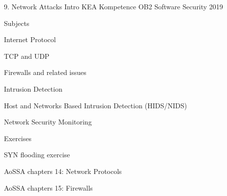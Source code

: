 \documentclass[Screen16to9,17pt]{foils}
\begin{document}
\mytitlepage
{9. Network Attacks Intro}
{KEA Kompetence OB2 Software Security 2019}


\begin{list1}
\item Subjects
\begin{list2}
\item Internet Protocol
\item TCP and UDP
\item Firewalls and related issues
\item Intrusion Detection
\item Host and Networks Based Intrusion Detection (HIDS/NIDS)
\item Network Security Monitoring
\end{list2}
\item Exercises
\begin{list2}
\item SYN flooding exercise
\end{list2}
\end{list1}


\begin{list1}
\item AoSSA chapters 14: Network Protocols
\item AoSSA chapters 15: Firewalls
\end{list1}



\begin{list1}
\item
\end{list1}


\end{document}
